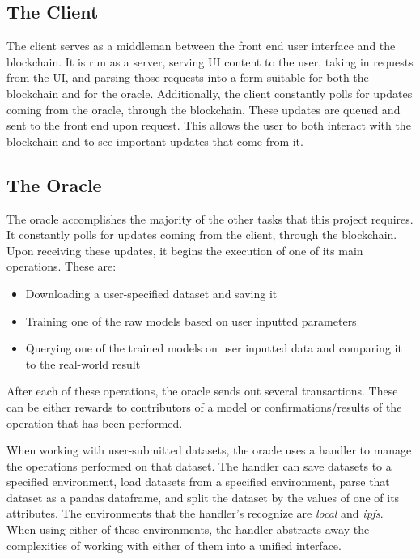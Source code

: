 \documentclass{article}
\begin{document}
    \subsection{The Client}

    The client serves as a middleman between the front end user interface and the
    blockchain.  It is run as a server, serving UI content to the user, taking in requests from the UI, and parsing those
    requests into a form suitable for both the blockchain and for the oracle.  Additionally, the client constantly polls
    for updates coming from the oracle, through the blockchain.  These updates are queued and sent to the front end upon
    request. This allows the user to both interact with the blockchain and to see important updates that come from it.

    \subsection{The Oracle}

    The oracle accomplishes the majority of the other tasks that this project requires.  It constantly polls for updates
    coming from the client, through the blockchain.  Upon receiving these updates, it begins the execution of one of its
    main operations.  These are:

    \begin{itemize}
        \item Downloading a user-specified dataset and saving it
        \item Training one of the raw models based on user inputted parameters
        \item Querying one of the trained models on user inputted data and comparing it to the real-world result
    \end{itemize}

    After each of these operations, the oracle sends out several transactions.  These can be either rewards to contributors
    of a model or confirmations/results of the operation that has been performed.

    When working with user-submitted datasets, the oracle uses a handler to manage the operations performed on that dataset.
    The handler can save datasets to a specified environment, load datasets from a specified environment, parse that dataset
    as a pandas dataframe, and split the dataset by the values of one of its attributes.  The environments that the handler's
    recognize are \textit{local} and \textit{ipfs}.  When using either of these environments, the handler abstracts away the
    complexities of working with either of them into a unified interface.
\end{document}
